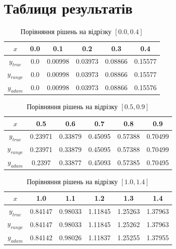 \documentclass{article}
\begin{document}
    \section{Таблиця результатів}
        \begin{table}[h!]
            \centering
            \begin{tabular}{|c|c|c|c|c|c|}
                \hline
                $x$ & 0.0 & 0.1 & 0.2 & 0.3 & 0.4 \\
                \hline
                $y_{true}$ & 0.0 & 0.00998 & 0.03973 & 0.08866 & 0.15577 \\
                \hline
                $y_{runge}$ & 0.0 & 0.00998 & 0.03973 & 0.08866 & 0.15577 \\
                \hline
                $y_{adam}$ & 0.0 & 0.00998 & 0.03973 & 0.08866 & 0.15576 \\
                \hline
            \end{tabular}
            \caption{Порівняння рішень на відрізку $[0.0, 0.4]$}
        \end{table}

        \begin{table}[h!]
            \centering
            \begin{tabular}{|c|c|c|c|c|c|}
                \hline
                $x$ & 0.5 & 0.6 & 0.7 & 0.8 & 0.9 \\
                \hline
                $y_{true}$ & 0.23971 & 0.33879 & 0.45095 & 0.57388 & 0.70499 \\
                \hline
                $y_{runge}$ & 0.23971 & 0.33879 & 0.45095 & 0.57388 & 0.70499 \\
                \hline
                $y_{adam}$ & 0.2397 & 0.33877 & 0.45093 & 0.57385 & 0.70495 \\
                \hline
            \end{tabular}
            \caption{Порівняння рішень на відрізку $[0.5, 0.9]$}
        \end{table}

        \begin{table}[h!]
            \centering
            \begin{tabular}{|c|c|c|c|c|c|}
                \hline
                $x$ & 1.0 & 1.1 & 1.2 & 1.3 & 1.4 \\
                \hline
                $y_{true}$ & 0.84147 & 0.98033 & 1.11845 & 1.25263 & 1.37963 \\
                \hline
                $y_{runge}$ & 0.84147 & 0.98033 & 1.11845 & 1.25262 & 1.37963 \\
                \hline
                $y_{adam}$ & 0.84142 & 0.98026 & 1.11837 & 1.25255 & 1.37955 \\
                \hline
            \end{tabular}
            \caption{Порівняння рішень на відрізку $[1.0, 1.4]$}
        \end{table}
\end{document}
